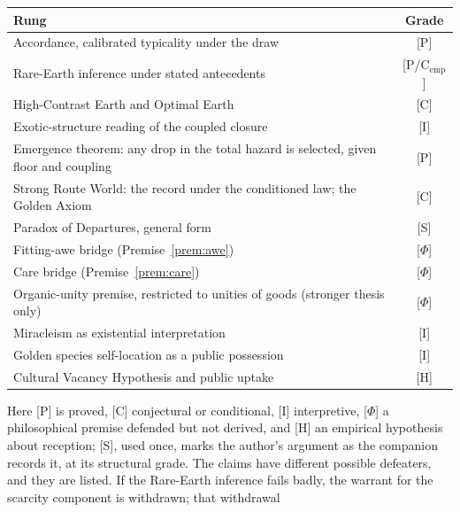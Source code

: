 \begin{center}\small
\begin{tabular}{@{}lc@{}}
\toprule
Rung & Grade\\
\midrule
Accordance, calibrated typicality under the draw & [P]\\
Rare-Earth inference under stated antecedents & [P/C$_{\mathrm{emp}}$]\\
High-Contrast Earth and Optimal Earth & [C]\\
Exotic-structure reading of the coupled closure & [I]\\
Emergence theorem: any drop in the total hazard is selected, given floor and coupling & [P]\\
Strong Route World: the record under the conditioned law; the Golden Axiom & [C]\\
Paradox of Departures, general form & [S]\\
Fitting-awe bridge (Premise~\ref{prem:awe}) & [$\Phi$]\\
Care bridge (Premise~\ref{prem:care}) & [$\Phi$]\\
Organic-unity premise, restricted to unities of goods (stronger thesis only) & [$\Phi$]\\
Miracleism as existential interpretation & [I]\\
Golden species self-location as a public possession & [I]\\
Cultural Vacancy Hypothesis and public uptake & [H]\\
\bottomrule
\end{tabular}
\end{center}
\noindent Here [P] is proved, [C] conjectural or conditional, [I]
interpretive, [$\Phi$] a philosophical premise defended but not derived, and
[H] an empirical hypothesis about reception; [S], used once, marks the
author's argument as the companion records it, at its structural grade. The claims have different
possible defeaters, and they are listed. If the Rare-Earth inference fails
badly, the warrant for the scarcity component is withdrawn; that withdrawal
